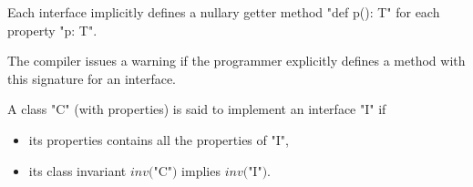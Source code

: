 Each interface implicitly defines a nullary getter method
\xcd"def p(): T" for each property \xcd"p: T". 

\begin{staticrule*}
   The compiler issues a warning if the programmer
   explicitly defines a method with this signature for an interface.
\end{staticrule*}

A class \xcd"C" (with properties) is said to implement an interface \xcd"I" if
\begin{itemize}
  \item its properties contains all the properties of \xcd"I",
\item its class invariant
$\mathit{inv}($\xcd"C"$)$ implies
$\mathit{inv}($\xcd"I"$)$.
\end{itemize}

